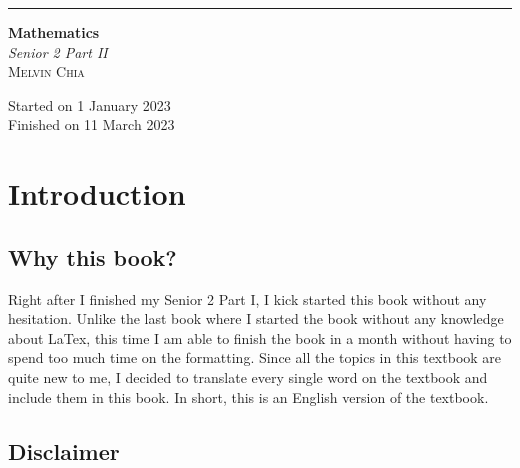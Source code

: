 \documentclass{report}
\begin{document}
\newcommand{\sol}[1]{

  \noindent \textbf{Sol.}
}
\newcommand{\prooff}[1]{

  \noindent \textbf{Proof.}
}

\newenvironment{cequation}{
  \makeatletter
  \setbool{@fleqn}{false}
  \makeatother
  \begin{equation*}
    }{\end{equation*}}

\begin{titlepage}
  \raggedleft{}
  \rule{1pt}{\textheight}
  \hspace{0.02\textwidth}
  \parbox[b]{0.75\textwidth}{

  {\fontsize{40}{60}\selectfont\bfseries Mathematics}\\[2\baselineskip]
  {\huge\textit{Senior 2 Part II}}\\[4\baselineskip]
  {\Large\textsc{Melvin Chia}}

  \vspace{0.5\textheight}

  {\noindent Started on 1 January 2023}\\[\baselineskip]
  {\noindent Finished on 11 March 2023}\\[\baselineskip]}

\end{titlepage}

\chapter*{Introduction}
 

\doublespacing{}
\section*{Why this book?}

Right after I finished my Senior 2 Part I, I kick started this book without any
hesitation. Unlike the last book where I started the book without any knowledge
about LaTex, this time I am able to finish the book in a month without having
to spend too much time on the formatting. Since all the topics in this textbook
are quite new to me, I decided to translate every single word on the textbook
and include them in this book. In short, this is an English version of the
textbook.

\section*{Disclaimer}
\end{document}
